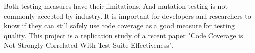 Both testing measures have their limitations. And mutation testing is not commonly accepted by industry. It is important for developers and researchers to know if they can still safely use code coverage as a good measure for testing quality. This project is a replication study of a recent paper "Code Coverage is Not Strongly Correlated With Test Suite Effectiveness".